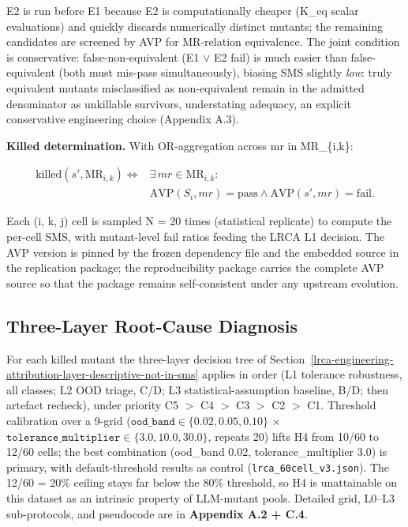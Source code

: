 \documentclass[manuscript,screen,review]{acmart}
\begin{document}
E2 is run before E1 because E2 is computationally cheaper (K\_eq scalar
evaluations) and quickly discards numerically distinct mutants; the
remaining candidates are screened by AVP for MR-relation equivalence.
The joint condition is conservative: false-non-equivalent (E1 $\vee$ E2 fail)
is much easier than false-equivalent (both must mis-pass
simultaneously), biasing SMS slightly \emph{low}: truly equivalent mutants misclassified
as non-equivalent remain in the admitted denominator as unkillable
survivors, understating adequacy, an explicit
conservative engineering choice (Appendix A.3).

\textbf{Killed determination.} With OR-aggregation across mr in
MR\_\{i,k\}:

\[
\begin{aligned}
\mathrm{killed}(s', \mathrm{MR}_{i,k}) \iff{} & \exists\,mr \in \mathrm{MR}_{i,k}: \\
& \mathrm{AVP}(S_i, mr) = \text{pass} \wedge
  \mathrm{AVP}(s', mr) = \text{fail}.
\end{aligned}
\]

Each (i, k, j) cell is sampled N = 20 times (statistical replicate) to
compute the per-cell SMS, with mutant-level fail ratios feeding the LRCA
L1 decision. The AVP version is pinned by the frozen dependency file and the
embedded source in the replication package; the reproducibility
package carries the complete AVP source so that the package remains
self-consistent under any upstream evolution.

\subsection{Three-Layer Root-Cause Diagnosis}\label{lrca-three-layer-diagnosis}

For each killed mutant the three-layer decision tree of
Section~\ref{lrca-engineering-attribution-layer-descriptive-not-in-sms} applies
in order (L1 tolerance robustness, all classes; L2 OOD triage, C/D; L3
statistical-assumption baseline, B/D; then artefact recheck), under priority
C5 $>$ C4 $>$ C3 $>$ C2 $>$ C1. Threshold calibration over a 9-grid
($\texttt{ood\_band} \in \{0.02, 0.05, 0.10\}$ $\times$
$\texttt{tolerance\_multiplier} \in \{3.0, 10.0, 30.0\}$, repeats 20) lifts H4
from 10/60 to 12/60 cells; the best combination (ood\_band 0.02,
tolerance\_multiplier 3.0) is primary, with default-threshold results as control
(\texttt{lrca\_60cell\_v3.json}). The 12/60 = 20\% ceiling stays far below the
80\% threshold, so H4 is unattainable on this dataset as an intrinsic property
of LLM-mutant pools. Detailed grid, L0--L3 sub-protocols, and pseudocode are in
\textbf{Appendix A.2 + C.4}.
\end{document}
